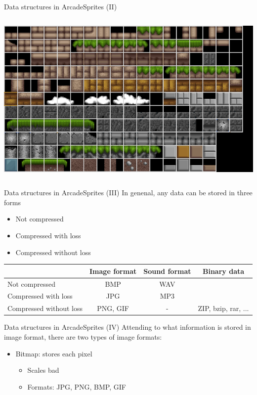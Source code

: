 \documentclass[10pt,compress]{beamer} %
\begin{document}
{\begin{frame}{Data structures in Arcade}{Sprites (II)}
\begin{columns}
		\includegraphics[width=\linewidth]{figs/blocks1.png}
   \end{columns}
\end{frame}

\begin{frame}{Data structures in Arcade}{Sprites (III)}
    In genenal, any data can be stored in three forms
        \begin{itemize}
        \item Not compressed
        \item Compressed with loss
        \item Compressed without loss
	    \end{itemize}

    \begin{table}
    \centering
    \begin{tabular}{l|c|c|c}
                            & Image format & Sound format & Binary data\\\hline
    Not compressed          & BMP          & WAV  &  \\
    Compressed with loss    & JPG          & MP3  &  \\
    Compressed without loss & PNG, GIF     & -    & ZIP, bzip, rar, ... 
    \end{tabular}
    \end{table}
\end{frame}

\begin{frame}{Data structures in Arcade}{Sprites (IV)}
    Attending to what information is stored in image format, there are two types of image formats:
        \begin{itemize}
            \item Bitmap: stores each pixel
                \begin{itemize}
                \item Scales bad
                \item Formats: JPG, PNG, BMP, GIF
                \end{itemize}


\end{itemize}
\end{frame}}
\end{document}
